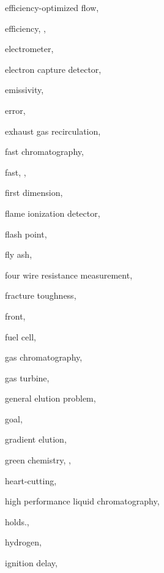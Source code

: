 \begin{theindex}
  \item \lowercase {efficiency-optimized flow}, 
  \item \lowercase {efficiency}, , 
  \item \lowercase {electrometer}, 
  \item \lowercase {electron capture detector}, 
  \item \lowercase {emissivity}, 
  \item \lowercase {error}, 
  \item \lowercase {exhaust gas recirculation}, 
  \item \lowercase {fast chromatography}, 
  \item \lowercase {fast}, , 
  \item \lowercase {first dimension}, 
  \item \lowercase {flame ionization detector}, 
  \item \lowercase {flash point}, 
  \item \lowercase {fly ash}, 
  \item \lowercase {four wire resistance measurement}, 
  \item \lowercase {fracture toughness}, 
  \item \lowercase {front}, 
  \item \lowercase {fuel cell}, 
  \item \lowercase {gas chromatography}, 
  \item \lowercase {gas turbine}, 
  \item \lowercase {general elution problem}, 
  \item \lowercase {goal}, 
  \item \lowercase {gradient elution}, 
  \item \lowercase {green chemistry}, , 
  \item \lowercase {heart-cutting}, 
  \item \lowercase {high performance liquid chromatography}, 
  \item \lowercase {holds.}, 
  \item \lowercase {hydrogen}, 
  \item \lowercase {ignition delay}, 

\end{theindex}
